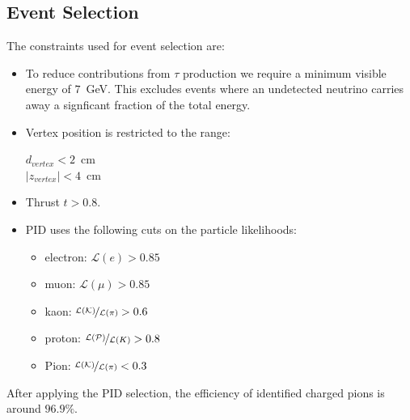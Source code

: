 \subsection{Event Selection}
\label{sec:eventselection}
The constraints used for event selection are:
\begin{itemize}
\item To reduce contributions from $\tau$ production we require a minimum visible energy of $7$~GeV.  This excludes events where an undetected neutrino carries away a signficant fraction of the total energy.
\item Vertex position is restricted to the range:
\begin{center}
$d_{vertex}<2$~cm   \\
$\lvert z_{vertex}\rvert < 4$~cm
\end{center}
\item Thrust $t>0.8$.
\item PID uses the following cuts on the particle likelihoods:
\begin{itemize}
  \item electron: $\mathcal{L}(e)>0.85$
  \item muon: $\mathcal{L}(\mu)>0.85$
  \item kaon: $\nicefrac{\mathcal{L}(\mathcal{K})}{\mathcal{L}(\pi)}>0.6$
  \item proton: $\nicefrac{\mathcal{L}(\mathcal{P})}{\mathcal{L}(K)}>0.8$
  \item Pion: $\nicefrac{\mathcal{L}(\mathcal{K})}{\mathcal{L}(\pi)}<0.3$
\end{itemize}
\end{itemize}
After applying the PID selection, the efficiency of identified charged pions is around $96.9\%$.

